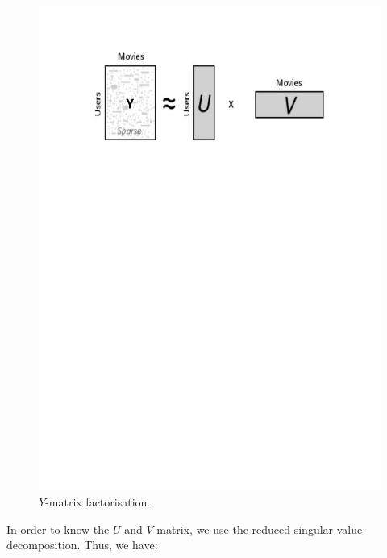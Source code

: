 \documentclass{article}
\begin{document}
\begin{figure}[H]
\centering
  \includegraphics[scale=0.4]{./images/facto.pdf}
  \caption{$Y$-matrix factorisation.}
  \label{fig:facto}
\end{figure}    

In order to know the $U$ and $V$ matrix, we use the reduced singular value decomposition. Thus, we have:
\end{document}
